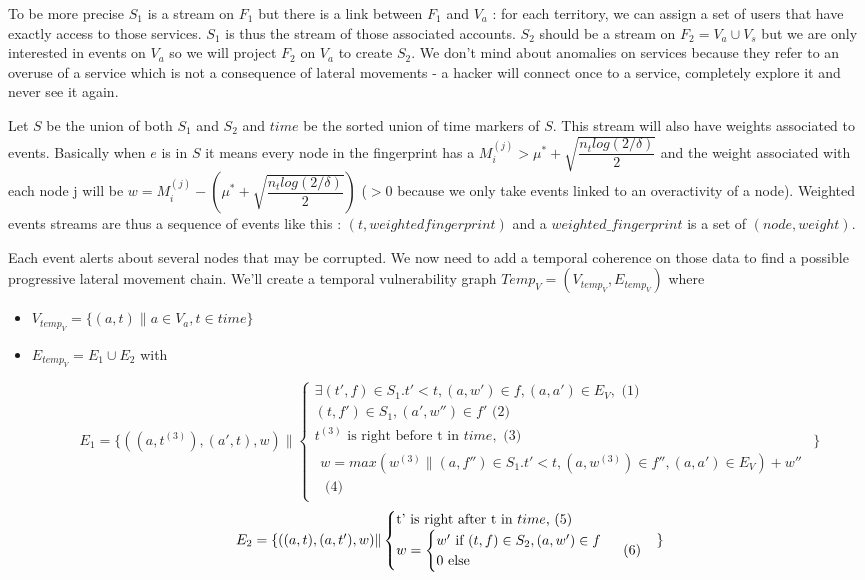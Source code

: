 \documentclass[11pt]{article}
\begin{document}
To be more precise $S_1$ is a stream on $F_1$ but there is a link between $F_1$ and $V_a$ : for each territory, we can assign a set of users that have exactly access to those services. $S_1$ is thus the stream of those associated accounts. $S_2$ should be a stream on $F_2=V_a\cup V_s$ but we are only interested in events on $V_a$ so we will project $F_2$ on $V_a$ to create $S_2$. We don't mind about anomalies on services because they refer to an overuse of a service which is not a consequence of lateral movements - a hacker will connect once to a service, completely explore it and never see it again.

Let $S$ be the union of both $S_1$ and $S_2$ and $time$ be the sorted union of time markers of $S$. This stream will also have weights associated to events. Basically when $e$ is in $S$ it means every node in the fingerprint has a $M_i^{(j)} > \mu^*+\sqrt{\dfrac{n_tlog(2/\delta)}{2}}$ and the weight associated with each node j will be $w = M_i^{(j)} - (\mu^*+\sqrt{\dfrac{n_tlog(2/\delta)}{2}})$ ($>0$ because we only take events linked to an overactivity of a node). Weighted events streams are thus a sequence of events like this : $(t,weighted fingerprint)$ and a $weighted\_fingerprint$ is a set of $(node,weight)$.

Each event alerts about several nodes that may be corrupted. We now need to add a temporal coherence on those data to find a possible progressive lateral movement chain. We'll create a temporal vulnerability graph $Temp_V=(V_{temp_V},E_{temp_V})$ where
\begin{itemize}
\item $V_{temp_V} = \{(a,t) \|a \in V_a, t\in time\}$
\item $E_{temp_V} = E_1 \cup E_2$ with

\begin{equation*}
E_1 = \{((a,t^{(3)}),(a',t),w) \|
\begin{cases}
\exists (t',f)\in S_1.t'<t,(a,w')\in f,(a,a')\in E_V,\mbox{ (1)}\\
(t,f')\in S_1,(a',w'')\in f'\mbox{ (2)}\\
\mbox{$t^{(3)}$ is right before t in $time$},\mbox{ (3)}\\
\begin{split}
w=max(w^{(3)}\|(a,f'')\in S_1.t'<t,(a,w^{(3)})\in f'',(a,a')\in E_V)+w''\\\mbox{ (4)}
\end{split}
\end{cases}\}
\end{equation*}
\begin{equation*}
\begin{split}
\mbox{$E_2 = \{((a,t),(a,t'),w) \|$}
\begin{cases}
\mbox{t' is right after t in $time$,\mbox{ (5)}}\\
w = \begin{cases}
\mbox{$w'$ if $(t,f)\in S_2,(a,w')\in f$}\\
\mbox{0 else}
\end{cases}\mbox{ (6)}
\end{cases}\}
\end{split}
\end{equation*}
\end{itemize}
\end{document}
